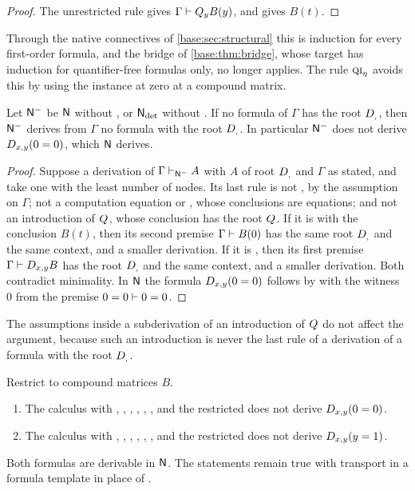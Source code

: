 \begin{proof}
The unrestricted rule gives $\Gamma\vdash Q_{y}B(y)$, and  gives
$B(t)$.
\end{proof}

Through the native connectives of \cref{base:sec:structural} this is
induction for every first-order formula, and the bridge of
\cref{base:thm:bridge}, whose target has induction for quantifier-free
formulas only, no longer applies.  The rule $\rulename{QI}_{\eta}$ avoids
this by using the instance at zero at a compound matrix.

\begin{proposition}
\label{kern:prop:nodi}
Let $\mathsf{N}^{-}$ be $\mathsf{N}$ without , or $\mathsf{N}_{\det}$ without
.  If no formula of $\Gamma$ has the root $D_{,}$, then
$\mathsf{N}^{-}$ derives from $\Gamma$ no formula with the root $D_{,}$.  In
particular $\mathsf{N}^{-}$ does not derive $D_{x,y}(0=0)$, which $\mathsf{N}$ derives.
\end{proposition}

\begin{proof}
Suppose a derivation of $\Gamma\vdash_{\mathsf{N}^{-}}A$ with $A$ of root
$D_{,}$ and $\Gamma$ as stated, and take one with the least number of nodes.
Its last rule is not , by the assumption on $\Gamma$; not a
computation equation or , whose conclusions are equations; and
not an introduction of $Q_{}$, whose conclusion has the root $Q_{}$.  If it
is  with the conclusion $B(t)$, then its second premise
$\Gamma\vdash B(0)$ has the same root $D_{,}$ and the same context, and a
smaller derivation.  If it is , then its first premise
$\Gamma\vdash D_{x,y}B$ has the root $D_{,}$ and the same context, and a
smaller derivation.  Both contradict minimality.  In $\mathsf{N}$ the formula
$D_{x,y}(0=0)$ follows by  with the witness $0$ from the
premise $0=0\vdash 0=0$.
\end{proof}

The assumptions inside a subderivation of an introduction of $Q_{}$ do not
affect the argument, because such an introduction is never the last rule of
a derivation of a formula with the root $D_{,}$.

\begin{proposition}
\label{kern:prop:compoundonly}
Restrict  to compound matrices $B$.
\begin{enumerate}[label=\textup{(\roman*)}]
\item The calculus with , , ,
 , , ,  and the
 restricted  does not derive $D_{x,y}(0=0)$.
\item The calculus with , , ,
 , , ,  and the
 restricted  does not derive $D_{x,y}(y=1)$.
\end{enumerate}
Both formulas are derivable in $\mathsf{N}$.  The statements remain true with
transport in a formula template in place of .
\end{proposition}

